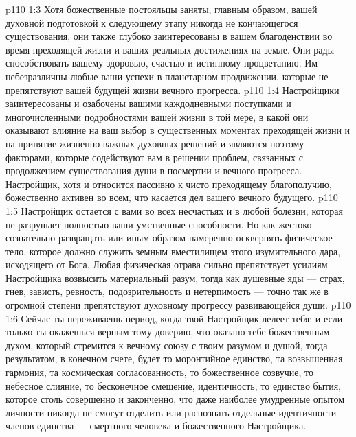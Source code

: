 \vs p110 1:3 Хотя божественные постояльцы заняты, главным образом, вашей духовной подготовкой к следующему этапу никогда не кончающегося существования, они также глубоко заинтересованы в вашем благоденствии во время преходящей жизни и ваших реальных достижениях на земле. Они рады способствовать вашему здоровью, счастью и истинному процветанию. Им небезразличны любые ваши успехи в планетарном продвижении, которые не препятствуют вашей будущей жизни вечного прогресса.
\vs p110 1:4 \pc Настройщики заинтересованы и озабочены вашими каждодневными поступками и многочисленными подробностями вашей жизни в той мере, в какой они оказывают влияние на ваш выбор в существенных моментах преходящей жизни и на принятие жизненно важных духовных решений и являются поэтому факторами, которые содействуют вам в решении проблем, связанных с продолжением существования души в посмертии и вечного прогресса. Настройщик, хотя и относится пассивно к чисто преходящему благополучию, божественно активен во всем, что касается дел вашего вечного будущего.
\vs p110 1:5 Настройщик остается с вами во всех несчастьях и в любой болезни, которая не разрушает полностью ваши умственные способности. Но как жестоко сознательно развращать или иным образом намеренно осквернять физическое тело, которое должно служить земным вместилищем этого изумительного дара, исходящего от Бога. Любая физическая отрава сильно препятствует усилиям Настройщика возвысить материальный разум, тогда как душевные яды --- страх, гнев, зависть, ревность, подозрительность и нетерпимость --- точно так же в огромной степени препятствуют духовному прогрессу развивающейся души.
\vs p110 1:6 \pc Сейчас ты переживаешь период, когда твой Настройщик лелеет тебя; и если только ты окажешься верным тому доверию, что оказано тебе божественным духом, который стремится к вечному союзу с твоим разумом и душой, тогда результатом, в конечном счете, будет то моронтийное единство, та возвышенная гармония, та космическая согласованность, то божественное созвучие, то небесное слияние, то бесконечное смешение, идентичность, то единство бытия, которое столь совершенно и законченно, что даже наиболее умудренные опытом личности никогда не смогут отделить или распознать отдельные идентичности членов единства --- смертного человека и божественного Настройщика.
